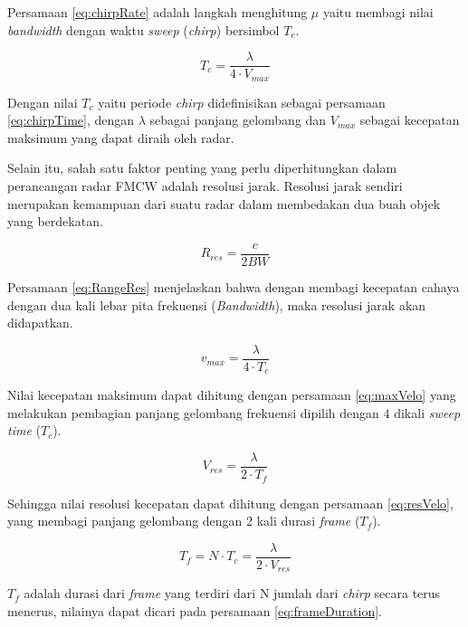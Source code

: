 Persamaan \ref{eq:chirpRate} adalah langkah menghitung $\mu$ yaitu membagi nilai \textit{bandwidth} dengan waktu \textit{sweep} (\textit{chirp}) bersimbol $T_{c}$.

\begin{equation}
	T_{c} = \frac{\lambda}{4 \cdot V_{max}}
	\label{eq:chirpTime}
\end{equation}

Dengan nilai $T_{c}$ yaitu periode \textit{chirp} didefinisikan sebagai persamaan \ref{eq:chirpTime}, dengan $\lambda$ sebagai panjang gelombang dan $V_{max}$ sebagai kecepatan maksimum yang dapat diraih oleh radar.

Selain itu, salah satu faktor penting yang perlu diperhitungkan dalam perancangan radar FMCW adalah resolusi jarak. Resolusi jarak sendiri merupakan kemampuan dari suatu radar dalam membedakan dua buah objek yang berdekatan.

\begin{equation}
	R_{res} = \frac{c}{2 BW}
	\label{eq:RangeRes}
\end{equation}

Persamaan \ref{eq:RangeRes} menjelaskan bahwa dengan membagi kecepatan cahaya dengan dua kali lebar pita frekuensi (\textit{Bandwidth}), maka resolusi jarak akan didapatkan. 

\begin{equation}
	v_{max} = \frac{\lambda}{4 \cdot T_{c}}
	\label{eq:maxVelo}
\end{equation}

Nilai kecepatan maksimum dapat dihitung dengan persamaan \ref{eq:maxVelo} yang melakukan pembagian panjang gelombang frekuensi dipilih dengan 4 dikali \textit{sweep time} ($T_{c}$).

\begin{equation}
	V_{res} = \frac{\lambda}{2 \cdot T_{f}}
	\label{eq:resVelo}
\end{equation}

Sehingga nilai resolusi kecepatan dapat dihitung dengan persamaan \ref{eq:resVelo}, yang membagi panjang gelombang dengan 2 kali durasi \textit{frame} ($T_{f}$).

\begin{equation}
	T_{f} = N \cdot T_{c} = \frac{\lambda}{2 \cdot V_{res}}
	\label{eq:frameDuration}
\end{equation}

$T_{f}$ adalah durasi dari \textit{frame} yang terdiri dari N jumlah dari \textit{chirp} secara terus menerus, nilainya dapat dicari pada persamaan \ref{eq:frameDuration}.

